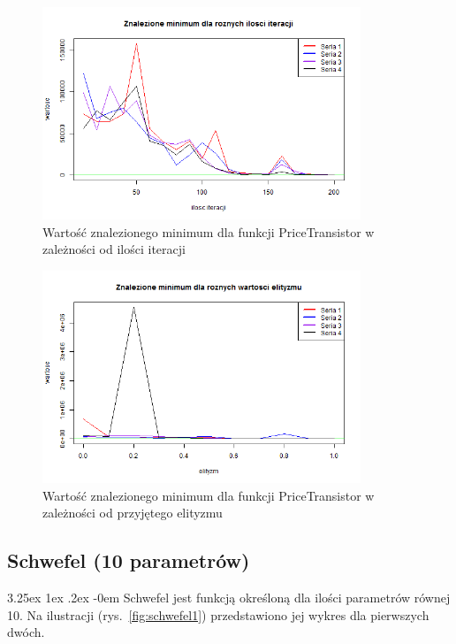 \documentclass[11pt, a4paper]{article}
\makeatletter
\renewcommand\paragraph{\@startsection{paragraph}{5}{\z@}
  {3.25ex \@plus1ex \@minus.2ex}
  {-0em}
  {\normalfont\normalsize\bfseries}}
\makeatother
\begin{document}
\begin{figure}[H]
	\begin{center}
		\includegraphics[width=0.85\textwidth]{./assets/PriceTransistor5.png}
		\caption{Wartość znalezionego minimum dla funkcji PriceTransistor w zależności od ilości iteracji}
		\label{fig:pricetransistor5}
	\end{center}
\end{figure}

\begin{figure}[H]
	\begin{center}
		\includegraphics[width=0.85\textwidth]{./assets/PriceTransistor6.png}
		\caption{Wartość znalezionego minimum dla funkcji PriceTransistor w zależności od przyjętego elityzmu}
		\label{fig:pricetransistor6}
	\end{center}
\end{figure}

\newpage
\subsection{Schwefel (10 parametrów)}
\paragraph{}
Schwefel jest funkcją określoną dla ilości parametrów równej 10. Na ilustracji (rys.~\ref{fig:schwefel1}) przedstawiono jej wykres dla pierwszych dwóch.
\end{document}

